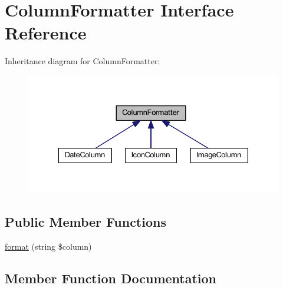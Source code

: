 \hypertarget{interfacehamburgscleanest_1_1_data_tables_1_1_interfaces_1_1_column_formatter}{}\section{Column\+Formatter Interface Reference}
\label{interfacehamburgscleanest_1_1_data_tables_1_1_interfaces_1_1_column_formatter}


Inheritance diagram for Column\+Formatter\+:
\nopagebreak
\begin{figure}[H]
\begin{center}
\leavevmode
\includegraphics[width=330pt]{interfacehamburgscleanest_1_1_data_tables_1_1_interfaces_1_1_column_formatter__inherit__graph}
\end{center}
\end{figure}
\subsection*{Public Member Functions}
\begin{DoxyCompactItemize}
\item 
\hyperlink{interfacehamburgscleanest_1_1_data_tables_1_1_interfaces_1_1_column_formatter_aba259f7ae8b25e70bd444020c04606e7}{format} (string \$column)
\end{DoxyCompactItemize}


\subsection{Member Function Documentation}
\mbox{\label{interfacehamburgscleanest_1_1_data_tables_1_1_interfaces_1_1_column_formatter_aba259f7ae8b25e70bd444020c04606e7}} 
